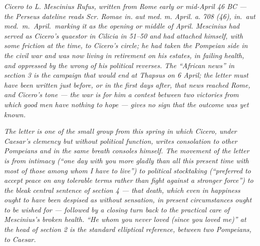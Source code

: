 
\textit{Cicero to L. Mescinius Rufus, written from Rome
early or mid-April 46 BC --- the Perseus dateline reads
\textit{Scr. Romae in. aut med. m. April. a. 708 (46)},
\textit{in.\ aut med.\ m.\ April.}\ marking it as the
opening or middle of April. Mescinius had served as Cicero's
quaestor in Cilicia in 51--50 and had attached himself,
with some friction at the time, to Cicero's circle; he
had taken the Pompeian side in the civil war and was now
living in retirement on his estates, in failing health, and
oppressed by the wrong of his political reverses. The
``African news'' in section 3 is the campaign that would
end at Thapsus on 6 April; the letter must have been written
just before, or in the first days after, that news reached
Rome, and Cicero's tone --- the war is for him a contest
between two victories from which good men have nothing to
hope --- gives no sign that the outcome was yet known.}

\textit{The letter is one of the small group from this
spring in which Cicero, under Caesar's clemency but
without political function, writes consolation to other
Pompeians and in the same breath consoles himself. The
movement of the letter is from intimacy (``one day with you
more gladly than all this present time with most of those
among whom I have to live'') to political stocktaking
(``preferred to accept peace on any tolerable terms rather
than fight against a stronger force'') to the bleak central
sentence of section 4 --- that death, which even in
happiness ought to have been despised as without sensation,
in present circumstances ought to be wished for ---
followed by a closing turn back to the practical care of
Mescinius's broken health. ``He whom you never loved (since
you loved me)'' at the head of section 2 is the standard
elliptical reference, between two Pompeians, to Caesar.}
